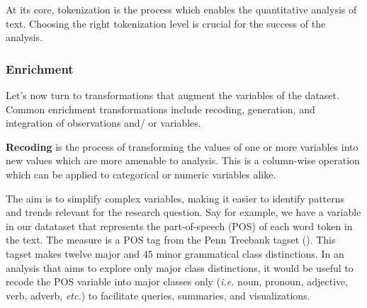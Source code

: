 \documentclass[
  letterpaper,
  DIV=11,
  numbers=noendperiod]{scrreprt}
\theoremstyle{definition}
\theoremstyle{remark}
\begin{document}
\begin{table}
\begin{minipage}{0.33\linewidth}


\end{minipage}%

\end{table}%

At its core, tokenization is the process which enables the quantitative
analysis of text. Choosing the right tokenization level is crucial for
the success of the analysis.

\subsubsection{Enrichment}\label{enrichment}

Let's now turn to transformations that augment the variables of the
dataset. Common enrichment transformations include recoding, generation,
and integration of observations and/ or variables.

\textbf{Recoding} is the process of transforming the values of one or
more variables into new values which are more amenable to analysis. This
is a column-wise operation which can be applied to categorical or
numeric variables alike.

The aim is to simplify complex variables, making it easier to identify
patterns and trends relevant for the research question. Say for example,
we have a variable in our datataset that represents the part-of-speech
(POS) of each word token in the text. The measure is a POS tag from the
Penn Treebank tagset (). This tagset makes twelve major and 45 minor
grammatical class distinctions. In an analysis that aims to explore only
major class distinctions, it would be useful to recode the POS variable
into major classes only (\emph{i.e.} noun, pronoun, adjective, verb,
adverb, \emph{etc.}) to facilitate queries, summaries, and
visualizations.
\end{document}
